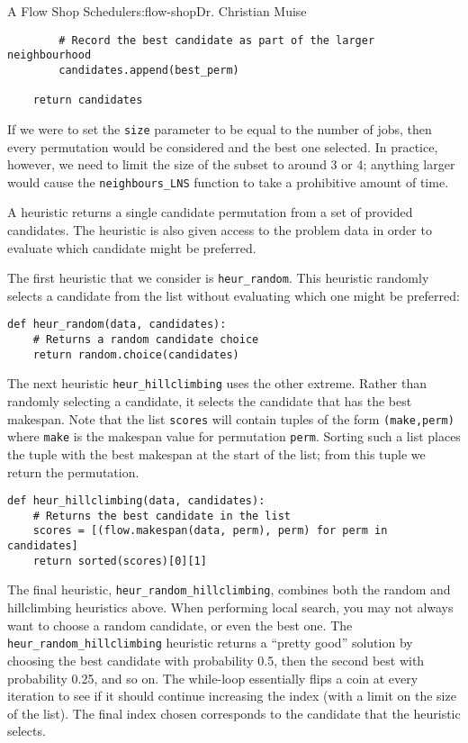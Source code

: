 \begin{aosachapter}{A Flow Shop Scheduler}{s:flow-shop}{Dr. Christian Muise}
\begin{verbatim}
        # Record the best candidate as part of the larger neighbourhood
        candidates.append(best_perm)

    return candidates
\end{verbatim}

If we were to set the \texttt{size} parameter to be equal to the number
of jobs, then every permutation would be considered and the best one
selected. In practice, however, we need to limit the size of the subset
to around 3 or 4; anything larger would cause the
\texttt{neighbours\_LNS} function to take a prohibitive amount of time.

\label{heuristics}

A heuristic returns a single candidate permutation from a set of
provided candidates. The heuristic is also given access to the problem
data in order to evaluate which candidate might be preferred.

The first heuristic that we consider is \texttt{heur\_random}. This
heuristic randomly selects a candidate from the list without evaluating
which one might be preferred:

\begin{verbatim}
def heur_random(data, candidates):
    # Returns a random candidate choice
    return random.choice(candidates)
\end{verbatim}

The next heuristic \texttt{heur\_hillclimbing} uses the other extreme.
Rather than randomly selecting a candidate, it selects the candidate
that has the best makespan. Note that the list \texttt{scores} will
contain tuples of the form \texttt{(make,perm)} where \texttt{make} is
the makespan value for permutation \texttt{perm}. Sorting such a list
places the tuple with the best makespan at the start of the list; from
this tuple we return the permutation.

\begin{verbatim}
def heur_hillclimbing(data, candidates):
    # Returns the best candidate in the list
    scores = [(flow.makespan(data, perm), perm) for perm in candidates]
    return sorted(scores)[0][1]
\end{verbatim}

The final heuristic, \texttt{heur\_random\_hillclimbing}, combines both
the random and hillclimbing heuristics above. When performing local
search, you may not always want to choose a random candidate, or even
the best one. The \texttt{heur\_random\_hillclimbing} heuristic returns
a ``pretty good'' solution by choosing the best candidate with
probability 0.5, then the second best with probability 0.25, and so on.
The while-loop essentially flips a coin at every iteration to see if it
should continue increasing the index (with a limit on the size of the
list). The final index chosen corresponds to the candidate that the
heuristic selects.


\end{aosachapter}
